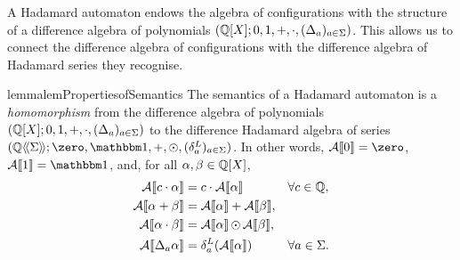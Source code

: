 A Hadamard automaton endows the algebra of configurations
with the structure of a difference algebra of polynomials
$(\mathbb Q[X]; 0, 1, +, \cdot, (\Delta_a)_{a \in \Sigma})$.
%
This allows us to connect the difference algebra of configurations
with the difference algebra of Hadamard series they recognise.
%
\begin{restatable}{lemma}{lemPropertiesofSemantics}
    \label{lem:Hadamard automata - properties of the semantics}
    The semantics of a Hadamard automaton is a \emph{homomorphism} from
    the difference algebra of polynomials
        $(\mathbb Q[X]; 0, 1, +, \cdot, (\Delta_a)_{a \in \Sigma})$
    to the difference Hadamard algebra of series 
        $\tuple{\series \Q \Sigma; \zero, \one, +, \hadamard, (\deriveleft a)_{a \in \Sigma}}$.
    In other words, $\Asem \AA 0 = \zero$, $\Asem \AA 1 = \one$,
    and, for all $\alpha, \beta \in \mathbb Q[X]$,
    \begin{align}
        \label{eq:hadamard:sem:scalar-product}
        \mathcal A\llbracket c \cdot \alpha\rrbracket
            &= c \cdot \mathcal A\llbracket\alpha\rrbracket 
            && \forall c \in \mathbb Q, \\
        \label{eq:hadamard:sem:sum}
        \mathcal A\llbracket\alpha + \beta\rrbracket
            &= \mathcal A\llbracket\alpha\rrbracket + \mathcal A\llbracket\beta\rrbracket, \\
        \label{eq:hadamard:sem:product}
            \mathcal A\llbracket\alpha \cdot \beta\rrbracket
            &= \mathcal A\llbracket\alpha\rrbracket \operatorname{\odot} \mathcal A\llbracket\beta\rrbracket, \\
        \label{eq:hadamard:sem:derivation}
        \mathcal A\llbracket\Delta_a \alpha\rrbracket
            &= \delta^L_{a} (\mathcal A\llbracket\alpha\rrbracket)
            && \forall a \in \Sigma.
    \end{align}
\end{restatable}
